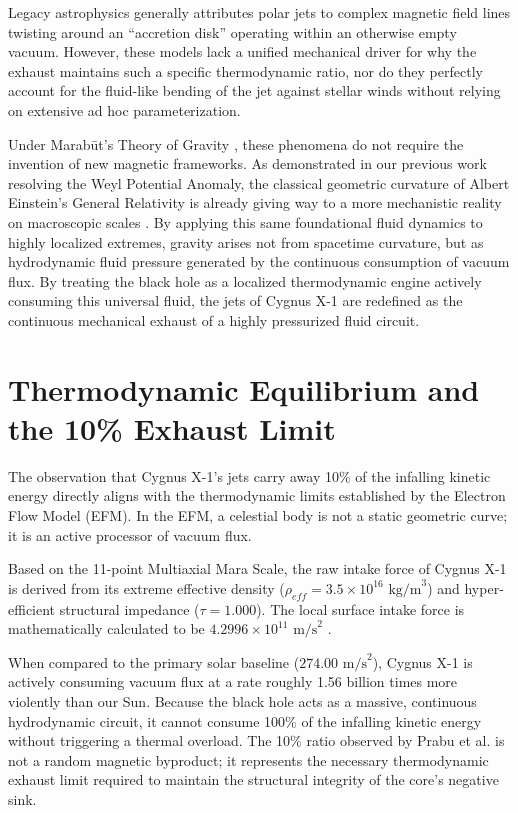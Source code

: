 \documentclass[11pt, a4paper]{article}
\begin{document}
Legacy astrophysics generally attributes polar jets to complex magnetic field lines twisting around an ``accretion disk'' operating within an otherwise empty vacuum. However, these models lack a unified mechanical driver for why the exhaust maintains such a specific thermodynamic ratio, nor do they perfectly account for the fluid-like bending of the jet against stellar winds without relying on extensive ad hoc parameterization.

Under Marab\={u}t's Theory of Gravity \cite{marabut2026paper01of19}, these phenomena do not require the invention of new magnetic frameworks. As demonstrated in our previous work resolving the Weyl Potential Anomaly, the classical geometric curvature of Albert Einstein's General Relativity is already giving way to a more mechanistic reality on macroscopic scales \cite{marabut2026paper02of19}. By applying this same foundational fluid dynamics to highly localized extremes, gravity arises not from spacetime curvature, but as hydrodynamic fluid pressure generated by the continuous consumption of vacuum flux. By treating the black hole as a localized thermodynamic engine actively consuming this universal fluid, the jets of Cygnus X-1 are redefined as the continuous mechanical exhaust of a highly pressurized fluid circuit.

\section{Thermodynamic Equilibrium and the 10\% Exhaust Limit}
The observation that Cygnus X-1's jets carry away 10\% of the infalling kinetic energy directly aligns with the thermodynamic limits established by the Electron Flow Model (EFM). In the EFM, a celestial body is not a static geometric curve; it is an active processor of vacuum flux.

Based on the 11-point Multiaxial Mara Scale, the raw intake force of Cygnus X-1 is derived from its extreme effective density ($\rho_{eff} = 3.5 \times 10^{16} \text{ kg/m}^3$) and hyper-efficient structural impedance ($\tau = 1.000$). The local surface intake force is mathematically calculated to be $4.2996 \times 10^{11} \text{ m/s}^2$ \cite{marabut2026paper01of19}. 

When compared to the primary solar baseline ($274.00 \text{ m/s}^2$), Cygnus X-1 is actively consuming vacuum flux at a rate roughly 1.56 billion times more violently than our Sun. Because the black hole acts as a massive, continuous hydrodynamic circuit, it cannot consume 100\% of the infalling kinetic energy without triggering a thermal overload. The 10\% ratio observed by Prabu et al. is not a random magnetic byproduct; it represents the necessary thermodynamic exhaust limit required to maintain the structural integrity of the core's negative sink.
\end{document}
